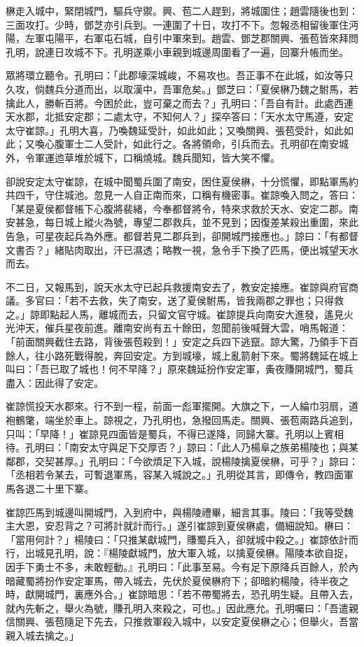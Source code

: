 楙走入城中，緊閉城門，驅兵守禦。興、苞二人趕到，將城圍住；趙雲隨後也到：三面攻打。少時，鄧芝亦引兵到。一連圍了十日，攻打不下。忽報丞相留後軍住沔陽，左軍屯陽平，右軍屯石城，自引中軍來到。趙雲、鄧芝郡關興、張苞皆來拜問孔明，說連日攻城不下。孔明遂乘小車親到城邊周圍看了一遍，回寨升帳而坐。

眾將環立聽令。孔明曰：「此郡壕深城峻，不易攻也。吾正事不在此城，如汝等只久攻，倘魏兵分道而出，以取漢中，吾軍危矣。」鄧芝曰：「夏侯楙乃魏之駙馬，若擒此人，勝斬百將。今困於此，豈可棄之而去？」孔明曰：「吾自有計。此處西連天水郡，北抵安定郡；二處太守，不知何人？」探卒答曰：「天水太守馬遵，安定太守崔諒。」孔明大喜，乃喚魏延受計，如此如此；又喚關興、張苞受計，如此如此；又喚心腹軍士二人受計，如此行之。各將領命，引兵而去。孔明卻在南安城外，令軍運迆草堆於城下，口稱燒城。魏兵聞知，皆大笑不懼。

卻說安定太守崔諒，在城中聞蜀兵圍了南安，困住夏侯楙，十分慌懼，即點軍馬約共四千，守住城池。忽見一人自正南而來，口稱有機密事。崔諒喚入問之，答曰：「某是夏侯都督帳下心腹將裴緒，今奉都督將令，特來求救於天水、安定二郡。南安甚急，每日城上縱火為號，專望二郡救兵，並不見到；因復差某殺出重圍，來此告急，可星夜起兵為外應。都督若見二郡兵到，卻開城門接應也。」諒曰：「有都督文書否？」緒貼肉取出，汗已濕透；略教一視，急令手下換了匹馬，便出城望天水而去。

不二日，又報馬到，說天水太守已起兵救援南安去了，教安定接應。崔諒與府官商議。多官曰：「若不去救，失了南安，送了夏侯駙馬，皆我兩郡之罪也；只得救之。」諒即點起人馬，離城而去，只留文官守城。崔諒提兵向南安大進發，遙見火光沖天，催兵星夜前進。離南安尚有五十餘田，忽聞前後喊聲大雲，哨馬報道：「前面關興截住去路，背後張苞殺到！」安定之兵四下逃竄。諒大驚，乃領手下百餘人，往小路死戰得脫，奔回安定。方到城壕，城上亂箭射下來。蜀將魏延在城上叫曰：「吾已取了城也！何不早降？」原來魏延扮作安定軍，夤夜賺開城門，蜀兵盡入：因此得了安定。

崔諒慌投天水郡來。行不到一程，前面一彪軍擺開。大旗之下，一人綸巾羽扇，道袍鶴氅，端坐於車上。諒視之，乃孔明也，急撥回馬走。關興、張苞兩路兵追到，只叫：「早降！」崔諒見四面皆是蜀兵，不得已遂降，同歸大寨。孔明以上賓相待。孔明曰：「南安太守與足下交厚否？」諒曰：「此人乃楊阜之族弟楊陵也；與某鄰郡，交契甚厚。」孔明曰：「今欲煩足下入城，說楊陵擒夏侯楙，可乎？」諒曰：「丞相若令某去，可暫退軍馬，容某入城說之。」孔明從其言，即傳令，教四面軍馬各退二十里下寨。

崔諒匹馬到城邊叫開城門，入到府中，與楊陵禮畢，細言其事。陵曰：「我等受魏主大恩，安忍背之？可將計就計而行。」遂引崔諒到夏侯楙處，備細說知。楙曰：「當用何計？」楊陵曰：「只推某獻城門，賺蜀兵入，卻就城中殺之。」崔諒依計而行，出城見孔明，說：『楊陵獻城門，放大軍入城，以擒夏侯楙。陽陵本欲自捉，因手下勇士不多，未敢輕動。』孔明曰：「此事至易。今有足下原降兵百餘人，於內暗藏蜀將扮作安定軍馬，帶入城去，先伏於夏侯楙府下；卻暗約楊陵，待半夜之時，獻開城門，裏應外合。」崔諒暗思：「若不帶蜀將去，恐孔明生疑。且帶入去，就內先斬之，舉火為號，賺孔明入來殺之，可也。」因此應允。孔明囑曰：「吾遣親信關興、張苞隨足下先去，只推救軍殺入城中，以安定夏侯楙之心；但舉火，吾當親入城去擒之。」

